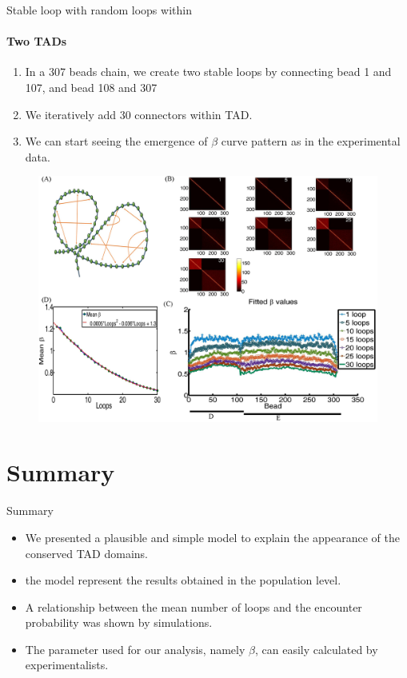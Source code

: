 \documentclass[8pt]{beamer}
\begin{document}
\begin{frame}{Stable loop with random loops within}
\framesubtitle{Two TADs}
\begin{enumerate}
\item In a 307 beads chain, we create two stable loops by connecting bead 1 and 107, and bead 108 and 307
\item We iteratively add 30 connectors within TAD.
\item We can start seeing the emergence of $\beta$ curve pattern as in the experimental data.
\end{enumerate}
\begin{figure}[H]
\includegraphics[scale=0.35]{Figure04_TwoTADs0To30RandomLoops307Beads}
\end{figure}
\end{frame}


\section{Summary}\label{section_summaryAndFutureWork}

\begin{frame}{Summary}
\begin{itemize}
\item We presented a plausible and simple model to explain the appearance of the conserved TAD domains. 
\item the model represent the results obtained in the population level.
\item A relationship between the mean number of loops and the encounter probability was shown by simulations.
\item The parameter used for our analysis, namely $\beta$, can easily calculated by experimentalists. 
\end{itemize}
\end{frame}
\end{document}
